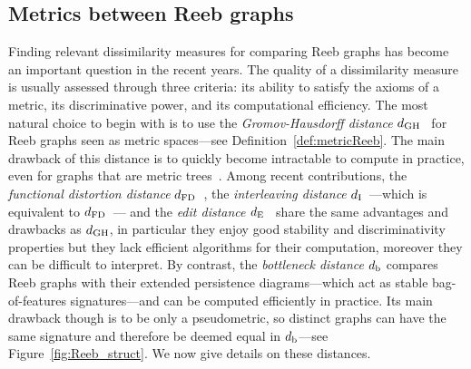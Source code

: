 \subsection{Metrics between Reeb graphs}
\label{sec:metrics}


Finding relevant dissimilarity measures for comparing Reeb graphs has become an important question in the recent years.
The quality of a dissimilarity measure is usually assessed through three criteria: 
its ability to satisfy the axioms of a metric, its discriminative power, and its computational efficiency.  	
The most natural choice to begin with is to use the {\em Gromov-Hausdorff distance} $d_{\rm GH}$~\cite{Burago01} for Reeb graphs 
seen as metric spaces---see Definition~\ref{def:metricReeb}.  
The main drawback of this distance is to quickly become intractable to compute in practice, even for graphs that are metric trees~\cite{Agarwal15}.
Among recent contributions, the {\em functional distortion distance}
$d_{\rm FD}$~\cite{Bauer14}, the {\em interleaving distance} $d_{\rm I}$~\cite{deSilva16}---which is equivalent to $d_{\rm FD}$~\cite{Bauer15}---
and the {\em edit distance $d_{\rm E}$}~\cite{Bauer16,DiFabio16} share the same advantages and drawbacks as
$d_{\rm GH}$, in particular they enjoy good stability and
discriminativity properties but they lack efficient algorithms for
their computation, moreover they can be difficult to interpret.  By
contrast, the {\em bottleneck distance} $d_{\rm b}$
compares Reeb graphs with their extended persistence diagrams---which act as stable
bag-of-features signatures---and can be computed
efficiently in practice.  Its main drawback though is to be only a
pseudometric, so distinct graphs can have the same signature and
therefore be deemed equal in $d_{\rm b}$---see Figure~\ref{fig:Reeb_struct}. We now give details on these distances.



